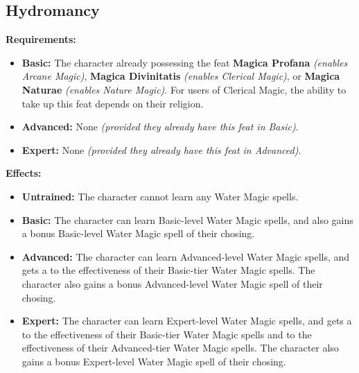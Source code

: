 \documentclass[openany,10pt,a4paper]{book}
\begin{document}
\subsection{Hydromancy}
\begin{table}[!ht]
\centering
{}
\end{table}
\textbf{Requirements:}
\begin{itemize}
	\item \textbf{Basic:} The character already possessing the feat \textbf{Magica Profana} \textit{(enables Arcane Magic)}, \textbf{Magica Divinitatis} \textit{(enables Clerical Magic)}, or \textbf{Magica Naturae} \textit{(enables Nature Magic)}. For users of Clerical Magic, the ability to take up this feat depends on their religion.
	\item \textbf{Advanced:} None \textit{(provided they already have this feat in Basic)}.
	\item \textbf{Expert:} None \textit{(provided they already have this feat in Advanced)}.
\end{itemize}
\textbf{Effects:}
\begin{itemize}
	\item \textbf{Untrained:} The character cannot learn any Water Magic spells.
	\item \textbf{Basic:} The character can learn Basic-level Water Magic spells, and also gains a bonus Basic-level Water Magic spell of their chosing.
	\item \textbf{Advanced:} The character can learn Advanced-level Water Magic spells, and gets a  to the effectiveness of their Basic-tier Water Magic spells. The character also gains a bonus Advanced-level Water Magic spell of their chosing.
	\item \textbf{Expert:} The character can learn Expert-level Water Magic spells, and gets a  to the effectiveness of their Basic-tier Water Magic spells and  to the effectiveness of their Advanced-tier Water Magic spells. The character also gains a bonus Expert-level Water Magic spell of their chosing.
\end{itemize}\newpage
\end{document}
